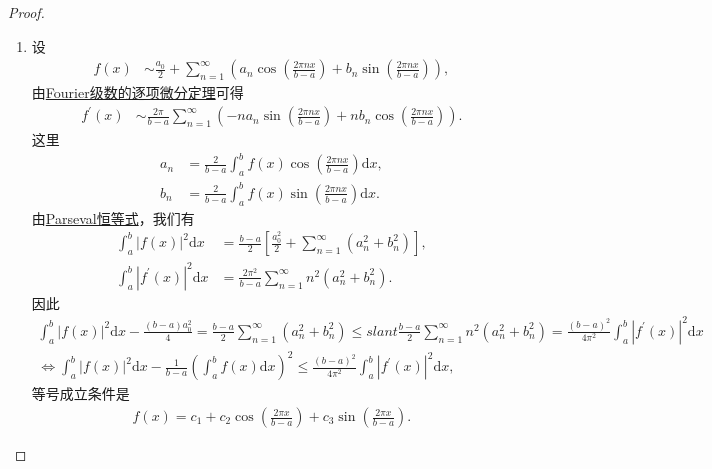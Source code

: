 \documentclass[../../main.tex]{subfiles}
\begin{document}
\begin{proof}
\begin{enumerate}[(1)]
\item 设
\begin{align*}
f(x) &\sim \frac{a_0}{2}+\sum_{n = 1}^{\infty}\left(a_n\cos\left(\frac{2\pi nx}{b - a}\right)+b_n\sin\left(\frac{2\pi nx}{b - a}\right)\right),
\end{align*}
由\hyperref[theorem:Fourier级数的逐项微分定理]{Fourier级数的逐项微分定理}可得
\begin{align*}
f^{\prime}(x) &\sim \frac{2\pi}{b - a}\sum_{n = 1}^{\infty}\left(-na_n\sin\left(\frac{2\pi nx}{b - a}\right)+nb_n\cos\left(\frac{2\pi nx}{b - a}\right)\right).
\end{align*}
这里
\begin{align*}
a_n&=\frac{2}{b - a}\int_{a}^{b}f(x)\cos\left(\frac{2\pi nx}{b - a}\right)\mathrm{d}x,\\
b_n&=\frac{2}{b - a}\int_{a}^{b}f(x)\sin\left(\frac{2\pi nx}{b - a}\right)\mathrm{d}x.
\end{align*}
由\hyperref[theorem:Parseval恒等式]{Parseval恒等式}，我们有
\begin{align*}
\int_{a}^{b}|f(x)|^2\mathrm{d}x&=\frac{b - a}{2}\left[\frac{a_0^2}{2}+\sum_{n = 1}^{\infty}(a_n^2 + b_n^2)\right],\\
\int_{a}^{b}|f^{\prime}(x)|^2\mathrm{d}x&=\frac{2\pi^2}{b - a}\sum_{n = 1}^{\infty}n^2(a_n^2 + b_n^2).
\end{align*}
因此
\begin{gather*}
\int_a^b{|f(x)|^2\mathrm{d}x}-\frac{\left( b-a \right) a_{0}^{2}}{4}=\frac{b-a}{2}\sum_{n=1}^{\infty}{\left( a_{n}^{2}+b_{n}^{2} \right)}\leqslant slant \frac{b-a}{2}\sum_{n=1}^{\infty}{n^2\left( a_{n}^{2}+b_{n}^{2} \right)}=\frac{(b-a)^2}{4\pi ^2}\int_a^b{|f^{\prime}(x)|^2\mathrm{d}x}
\\
\Longleftrightarrow \int_a^b{|f(x)|^2\mathrm{d}x}-\frac{1}{b-a}\left( \int_a^b{f(x)\mathrm{d}x} \right) ^2\le \frac{(b-a)^2}{4\pi ^2}\int_a^b{|f^{\prime}(x)|^2\mathrm{d}x},
\end{gather*}
等号成立条件是
\begin{align*}
f(x)=c_1 + c_2\cos\left(\frac{2\pi x}{b - a}\right)+c_3\sin\left(\frac{2\pi x}{b - a}\right).
\end{align*}


\end{enumerate}
\end{proof}
\end{document}
